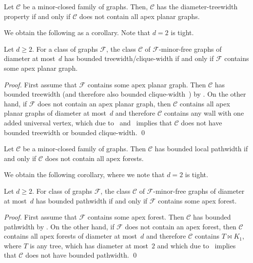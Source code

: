 \documentclass[runningheads,envcountsame]{llncs}
\newcommand{\forbiddenClass}{\mathcal{F}}
\newcommand{\join}{\bowtie}
\begin{document}
\begin{theorem}\label{thm:Eppstein}
  Let $\mathcal{C}$ be a minor-closed family of graphs. Then, $\mathcal{C}$ has the diameter-treewidth property if and only if $\mathcal{C}$ does not contain all apex planar graphs.
\end{theorem}
We obtain the following as a corollary. Note that $d=2$ is tight.
\begin{corollary}
Let $d\geq 2$.
  For a class of graphs $\forbiddenClass$, 
  the class $\mathcal{C}$ of $\forbiddenClass$-minor-free graphs of
  diameter at most~$d$ has bounded treewidth/clique-width if and only if
  $\forbiddenClass$ contains some apex planar graph.
\end{corollary}
\begin{proof}
  First assume that $\forbiddenClass$ contains some apex planar graph. Then
  $\mathcal{C}$ has bounded treewidth (and therefore also bounded
  clique-width~) by . On the
  other hand, if $\forbiddenClass$ does not contain an apex planar graph,
  then $\mathcal{C}$ contains all apex planar graphs of diameter at most~$d$
  and therefore $\mathcal{C}$ contains any wall with one added universal
  vertex, which due to~ and~
  implies that $\mathcal{C}$ does not have bounded treewidth or
  bounded clique-width. \qed
\end{proof}

\begin{theorem}\label{thm:localpw}
  Let $\mathcal{C}$ be a minor-closed family of graphs. Then
  $\mathcal{C}$ has bounded local pathwidth if and only if
  $\mathcal{C}$ does not contain all apex forests.
\end{theorem}

We obtain the following corollary, where we note that $d=2$ is tight.
\begin{corollary}
Let $d\geq 2$.
  For  class of graphs $\forbiddenClass$, 
  the class $\mathcal{C}$ of $\forbiddenClass$-minor-free graphs of
  diameter at most~$d$ has bounded pathwidth if and only if
  $\forbiddenClass$ contains some apex forest.
\end{corollary}
\begin{proof}
  First assume that $\forbiddenClass$ contains some apex forest. Then
  $\mathcal{C}$ has bounded pathwidth by . On the
  other hand, if $\forbiddenClass$ does not contain an apex forest,
  then $\mathcal{C}$ contains all apex forests of diameter at most~$d$
  and therefore $\mathcal{C}$ contains $T\join K_1$, where $T$ is any tree, which has diameter at most~$2$ and which due to~ implies that $\mathcal{C}$ does not have bounded pathwidth. \qed
\end{proof}
\end{document}
